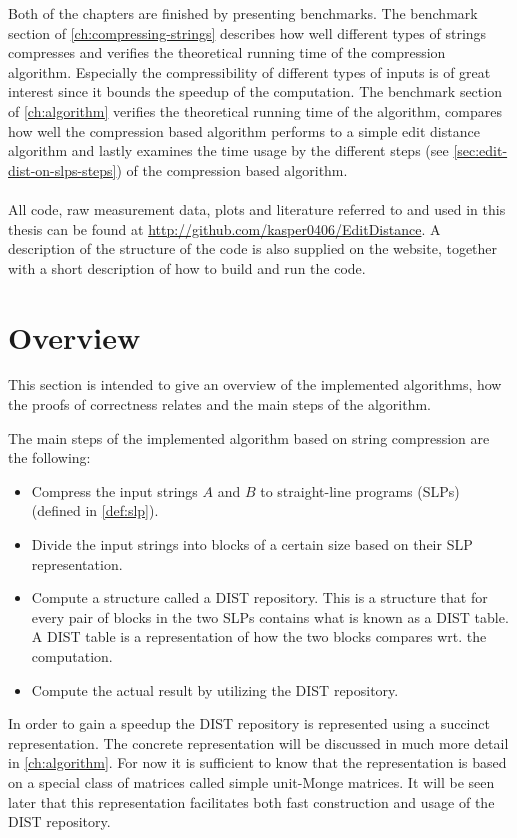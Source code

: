 \documentclass[twoside,11pt,openright]{report}
\newcommand{\thesisurl}{\url{http://github.com/kasper0406/EditDistance}}
\begin{document}
Both of the chapters are finished by presenting benchmarks. The benchmark section of \cref{ch:compressing-strings} describes how well different types of strings compresses and verifies the theoretical running time of the compression algorithm. Especially the compressibility of different types of inputs is of great interest since it bounds the speedup of the computation. The benchmark section of \cref{ch:algorithm} verifies the theoretical running time of the algorithm, compares how well the compression based algorithm performs to a simple edit distance algorithm and lastly examines the time usage by the different steps (see \cref{sec:edit-dist-on-slps-steps}) of the compression based algorithm.

\paragraph{}
All code, raw measurement data, plots and literature referred to and used in this thesis can be found at \thesisurl. A description of the structure of the code is also supplied on the website, together with a short description of how to build and run the code.

\section{Overview}
This section is intended to give an overview of the implemented algorithms, how the proofs of correctness relates and the main steps of the algorithm.

The main steps of the implemented algorithm based on string compression are the following:
\begin{itemize}
  \item Compress the input strings $A$ and $B$ to straight-line programs (SLPs) (defined in \cref{def:slp}).
  \item Divide the input strings into blocks of a certain size based on their SLP representation.
  \item Compute a structure called a DIST repository. This is a structure that for every pair of blocks in the two SLPs contains what is known as a DIST table. A DIST table is a representation of how the two blocks compares wrt. the computation.
  \item Compute the actual result by utilizing the DIST repository.
\end{itemize}
In order to gain a speedup the DIST repository is represented using a succinct representation. The concrete representation will be discussed in much more detail in \cref{ch:algorithm}. For now it is sufficient to know that the representation is based on a special class of matrices called simple unit-Monge matrices. It will be seen later that this representation facilitates both fast construction and usage of the DIST repository.
\end{document}
